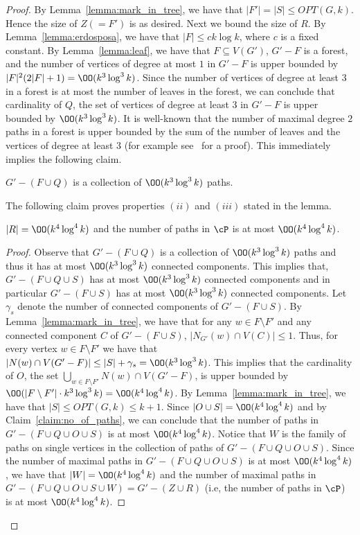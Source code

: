\begin{proof}
By Lemma~\ref{lemma:mark_in_tree}, 
we have that $\vert F'\vert= \vert S \vert \leq OPT(G,k)$. Hence the size of $Z(=F')$ is as desired. 
Next we bound the size of $R$.  
By  Lemma~\ref{lemma:erdosposa}, we have that $\vert F\vert\leq ck\log k$, where $c$ is a fixed constant.   
By Lemma~\ref{lemma:leaf}, we have that $F\subseteq V(G')$, $G'-F$ is a forest, and 
the number of vertices of  degree at most $1$ in $G'-F$ is upper bounded by $\vert F\vert^2(2\vert F\vert+1)=\OO(k^3\log^3 k)$. 
Since the number of vertices of degree at least $3$ in a forest is at most the number of leaves in the forest, we can conclude 
that cardinality of $Q$, the set of vertices of degree at least $3$ in $G'-F$ is upper bounded by $\OO(k^3\log^3 k)$. It is well-known that the number of maximal degree $2$ paths in a forest is  upper bounded by the sum of the number of leaves and the vertices of degree at least $3$ 
(for example see~\cite{RamanSS06} for a proof). This immediately implies the following claim. 

\begin{claim}
 \label{claim:no_of_paths}
 $G'-(F\cup Q)$ is a collection of $\OO(k^3\log^3 k)$ paths. 
\end{claim}
The following claim proves properties $(ii)$ and $(iii)$ stated in the lemma. 
\begin{claim}
\label{claim:CPboundR}
$\vert R\vert = \OO(k^4\log^4 k)$ and the number of paths in $\cP$ is at most  $\OO(k^4\log^4 k)$. 
\end{claim}
\begin{proof}
Observe that $G'-(F\cup Q)$ is a 
collection of $\OO(k^3\log^3 k)$ paths and thus it has at most  $\OO(k^3\log^3 k)$ connected components. This implies that, $G'-(F\cup Q \cup S)$ has at most  $\OO(k^3\log^3 k)$ connected components and in particular $G'-(F \cup S)$ has at most  $\OO(k^3\log^3 k)$ connected components. 
Let $\gamma_s$ denote the number of connected components of $G'-(F \cup S)$. 
By Lemma~\ref{lemma:mark_in_tree}, we have that 
for any $w\in F \setminus F'$ and any connected component $C$ of $G'-(F\cup S)$, 
$\vert N_{G'}(w)\cap V(C) \vert \leq 1$.  Thus, for every vertex  $w\in F \setminus F'$ we have that 
$|N(w)\cap V(G'-F)|\leq |S|+ \gamma_s=\OO(k^3\log^3 k)$. 
This
implies that the cardinality of $O$, the set $\bigcup_{w\in F\setminus F'} N(w)\cap V(G'-F)$,  
is upper bounded by $\OO( \vert F \setminus F'\vert \cdot k^3\log^3 k)=\OO( k^4\log^4 k)$.  
By Lemma~\ref{lemma:mark_in_tree}, we have that $\vert S\vert\leq OPT(G,k)\leq k+1$. 
Since $\vert O \cup S  \vert =\OO( k^4\log^4 k)$ and by Claim~\ref{claim:no_of_paths}, we can conclude 
that the number of paths in $G'-(F\cup Q \cup O\cup S)$ is at most $\OO( k^4\log^4 k)$. 
Notice that $W$ is the family of paths on single vertices in the collection of paths of 
$G'-(F\cup Q \cup O\cup S)$. 
Since the number of maximal paths in $G'-(F\cup Q \cup O\cup S)$ is at most $\OO( k^4\log^4 k)$, 
we have that $\vert W \vert= \OO( k^4\log^4 k)$ and 
the number of maximal paths in $G'-(F\cup Q \cup O\cup S \cup W)=G'-(Z\cup R)$ (i.e, the 
number of paths in $\cP$) is at most $\OO( k^4\log^4 k)$. 


\end{proof}
\end{proof}

